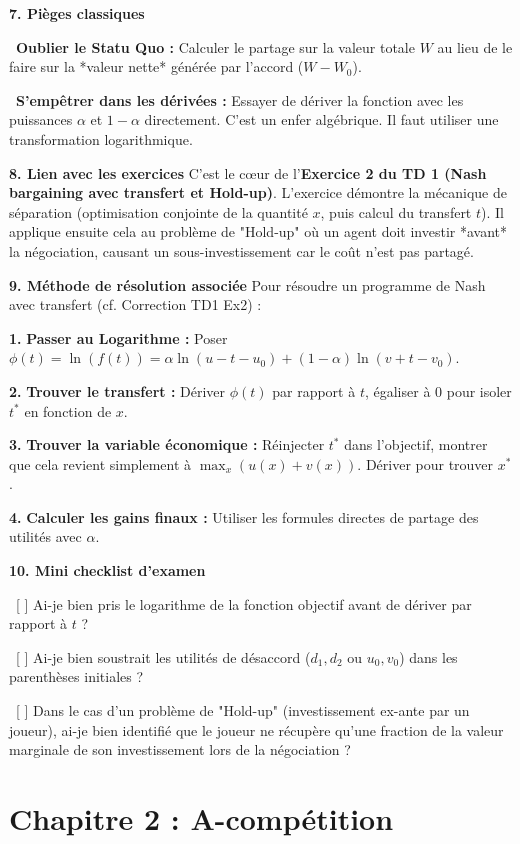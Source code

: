 \documentclass[11pt, a4paper]{report}
\begin{document}
\textbf{7. Pièges classiques}
\par \textbullet\ \textbf{Oublier le Statu Quo :} Calculer le partage sur la valeur totale $W$ au lieu de le faire sur la *valeur nette* générée par l'accord ($W - W_0$).
\par \textbullet\ \textbf{S'empêtrer dans les dérivées :} Essayer de dériver la fonction avec les puissances $\alpha$ et $1-\alpha$ directement. C'est un enfer algébrique. Il faut utiliser une transformation logarithmique.

\textbf{8. Lien avec les exercices}
C'est le cœur de l'\textbf{Exercice 2 du TD 1 (Nash bargaining avec transfert et Hold-up)}. L'exercice démontre la mécanique de séparation (optimisation conjointe de la quantité $x$, puis calcul du transfert $t$). Il applique ensuite cela au problème de "Hold-up" où un agent doit investir *avant* la négociation, causant un sous-investissement car le coût n'est pas partagé.

\textbf{9. Méthode de résolution associée}
Pour résoudre un programme de Nash avec transfert (cf. Correction TD1 Ex2) :
\par \textbf{1.} \textbf{Passer au Logarithme :} Poser $\phi(t) = \ln(f(t)) = \alpha \ln(u - t - u_0) + (1-\alpha)\ln(v + t - v_0)$.
\par \textbf{2.} \textbf{Trouver le transfert :} Dériver $\phi(t)$ par rapport à $t$, égaliser à 0 pour isoler $t^*$ en fonction de $x$.
\par \textbf{3.} \textbf{Trouver la variable économique :} Réinjecter $t^*$ dans l'objectif, montrer que cela revient simplement à $\max_x (u(x) + v(x))$. Dériver pour trouver $x^*$.
\par \textbf{4.} \textbf{Calculer les gains finaux :} Utiliser les formules directes de partage des utilités avec $\alpha$.

\textbf{10. Mini checklist d'examen}
\par \textbullet\ [ ] Ai-je bien pris le logarithme de la fonction objectif avant de dériver par rapport à $t$ ?
\par \textbullet\ [ ] Ai-je bien soustrait les utilités de désaccord ($d_1, d_2$ ou $u_0, v_0$) dans les parenthèses initiales ?
\par \textbullet\ [ ] Dans le cas d'un problème de "Hold-up" (investissement ex-ante par un joueur), ai-je bien identifié que le joueur ne récupère qu'une fraction de la valeur marginale de son investissement lors de la négociation ?
\newpage
\chapter{Chapitre 2 : A-compétition}
\end{document}
